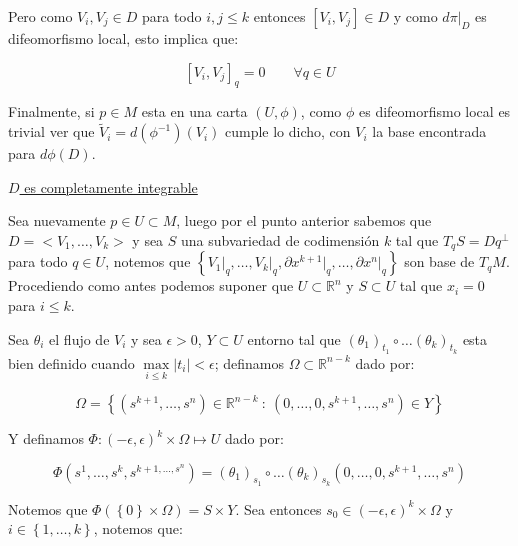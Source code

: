 \documentclass[11pt]{article}
\newcommand{\R}{{\mathbb{R}}}
\newcommand\tq{~:~}
\newcommand{\abs}[1]{\left\lvert#1\right\rvert}
\newcommand{\sett}[1]{\left\lbrace#1\right\rbrace}
\numberwithin{theorem}{subsection}
\newenvironment{proof}[1][Demostraci\'on]{\begin{trivlist}
		\item[\hskip \labelsep {\bfseries #1}]}{\end{trivlist}}
\newenvironment{definition}[1][Definici\'on]{\begin{trivlist}
		\item[\hskip \labelsep {\bfseries #1}]}{\end{trivlist}}
\begin{document}
\begin{proof}
\begin{definition}
\begin{proof}
			Pero como $V_i,V_j \in D$ para todo $i,j \leq k$ entonces $\left[V_i, V_j\right] \in D$ y como $d \pi \vert_{D}$ es difeomorfismo local, esto implica que:
			
			\begin{equation*}
				\left[V_i, V_j\right] _q = 0 \qquad \forall q \in U
			\end{equation*}
			
			Finalmente, si $p \in M$ esta en una carta $(U, \phi)$, como $\phi$ es difeomorfismo local es trivial ver que $\tilde{V}_i = d\left(\phi^{-1}\right)\left(V_i\right)$ cumple lo dicho, con $V_i$ la base encontrada para $d\phi(D)$.
			
			\medbreak
			\underline{$D$ es completamente integrable}
			\medbreak
			
			Sea nuevamente $p \in U \subset M$, luego por el punto anterior sabemos que $D = <V_1, \dots, V_k>$ y sea $S$ una subvariedad de codimensi\'on $k$ tal que $T_qS = Dq^{\perp}$ para todo $q \in U$, notemos que $\sett{V_1 \vert_{q}, \dots, V_k \vert_q, \partial x^{k+1} \vert_q, \dots, \partial x^{n} \vert_q}$ son base de $T_qM$. Procediendo como antes podemos suponer que $U \subset \R^n$ y $S \subset U$ tal que $x_i = 0$ para $i \leq k$.
			
			Sea $\theta_i$ el flujo de $V_i$ y sea $\epsilon > 0$, $Y \subset U$ entorno tal que $(\theta_1)_{t_1} \circ \dots (\theta_k)_{t_k}$ esta bien definido cuando $\max\limits_{i \leq k} {\abs{t_i}} < \epsilon$; definamos $\Omega \subset \R^{n-k}$ dado por:
			
			$$\Omega = \sett{(s^{k+1}, \dots, s^n) \in \R^{n-k} \tq (0, \dots, 0, s^{k+1}, \dots, s^n) \in Y}$$
			
			Y definamos $\Phi: (-\epsilon, \epsilon)^k \times \Omega \mapsto U$ dado por:
			
			$$\Phi(s^1, \dots, s^k, s^{k+1, \dots, s^n}) = (\theta_1)_{s_1} \circ \dots (\theta_k)_{s_k} (0, \dots, 0, s^{k+1}, \dots, s^n) $$
			
			Notemos que $\Phi\left(\sett{0} \times \Omega \right) = S \times Y$. Sea entonces $s_0 \in (-\epsilon, \epsilon)^k \times \Omega $ y $i \in \sett{1, \dots, k}$, notemos que:
			

\end{proof}
\end{definition}
\end{proof}
\end{document}
